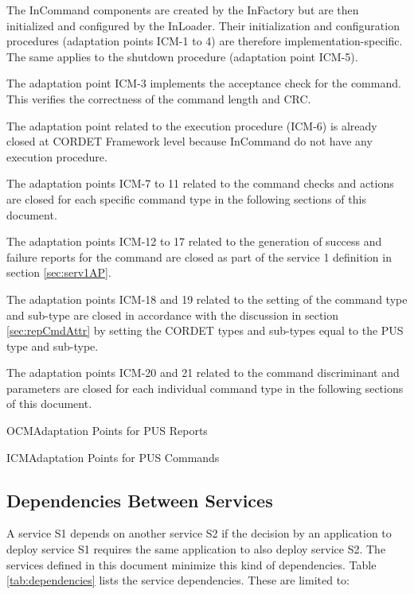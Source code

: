 \documentclass{pnp_article}
\begin{document}
\begin{fw_itemize}
\item The InCommand components are created by the InFactory but are then initialized and configured by the InLoader. Their initialization and configuration procedures (adaptation points ICM-1 to 4) are therefore implementation-specific. The same applies to the shutdown procedure (adaptation point ICM-5).
\item The adaptation point ICM-3 implements the acceptance check for the command. This verifies the correctness of the command length and CRC.
\item The adaptation point related to the execution procedure (ICM-6) is already closed at CORDET Framework level because InCommand do not have any execution procedure.
\item The adaptation points ICM-7 to 11 related to the command checks and actions are closed for each specific command type in the following sections of this document.
\item The adaptation points ICM-12 to 17 related to the generation of success and failure reports for the command are closed as part of the service 1 definition in section \ref{sec:serv1AP}.
\item The adaptation points ICM-18 and 19 related to the setting of the command type and sub-type are closed in accordance with the discussion in section \ref{sec:repCmdAttr} by setting the CORDET types and sub-types equal to the PUS type and sub-type.
\item The adaptation points ICM-20 and 21 related to the command discriminant and parameters are closed for each individual command type in the following sections of this document.
\end{fw_itemize}

\begin{cr_ap}{OCM}{Adaptation Points for PUS Reports}
\end{cr_ap}

\newpage
\begin{cr_ap}{ICM}{Adaptation Points for PUS Commands}
\end{cr_ap}

\subsection{Dependencies Between Services}\label{sec:dependencies}
A service S1 depends on another service S2 if the decision by an application to deploy service S1 requires the same application to also deploy service S2. The services defined in this document minimize this kind of dependencies. Table \ref{tab:dependencies} lists the service dependencies. These are limited to:
\end{document}
